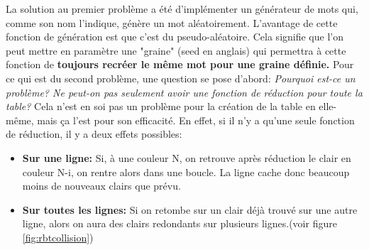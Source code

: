 \documentclass[french,12pt]{article}
\begin{document}
         \newline
         \indent La solution au premier problème a été d'implémenter un générateur de mots qui, comme son nom l'indique, génère un mot aléatoirement. L'avantage de cette fonction de génération est que c'est du pseudo-aléatoire. Cela signifie que l'on peut mettre en paramètre une "graine" (seed en anglais) qui permettra à cette fonction de \textbf{toujours recréer le même mot pour une graine définie.}
         \newline
         \indent Pour ce qui est du second problème, une question se pose d'abord: \textit{Pourquoi est-ce un problème? Ne peut-on pas seulement avoir une fonction de réduction pour toute la table?} Cela n'est en soi pas un problème pour la création de la table en elle-même, mais ça l'est pour son efficacité. En effet, si il n'y a qu'une seule fonction de réduction, il y a deux effets possibles: 
         \begin{itemize}
             \item \textbf{Sur une ligne: } Si, à une couleur N, on retrouve après réduction le clair en couleur N-i, on rentre alors dans une boucle. La ligne cache donc beaucoup moins de nouveaux clairs que prévu.
             \item \textbf{Sur toutes les lignes: } Si on retombe sur un clair déjà trouvé sur une autre ligne, alors on aura des clairs redondants sur plusieurs lignes.(voir figure \ref{fig:rbtcollision})
         \end{itemize}
\end{document}
